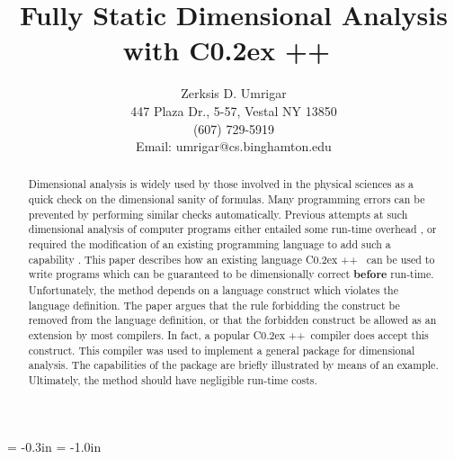 
\pagestyle{empty}
\footskip 2in %


\hoffset= -0.3in
\voffset= -1.0in
\setlength{\textwidth}{6.5in}\setlength{\textheight}{9in}
\setlength{\oddsidemargin}{0.3in}\setlength{\evensidemargin}{0.3in}
\setlength{\parindent}{0pt}\setlength{\parskip}{1.5ex}

\newcommand{\cpp}{C\raise 0.2ex \hbox{++}}
\newcommand{\gpp}{G\raise 0.2ex \hbox{++}}
\newcommand{\meter}{\hbox{Meter}}
\newcommand{\kg}{\hbox{Kg}}
\newcommand{\second}{\hbox{Sec}}

\title{Fully Static Dimensional Analysis with \cpp\ }
\author{
Zerksis D. Umrigar\\
447 Plaza Dr., 5-57, Vestal NY 13850\\
(607) 729-5919\\
Email: umrigar@cs.binghamton.edu
}
\date{}

\maketitle

\begin{abstract}

Dimensional analysis is widely used by those involved in the
physical sciences as a quick check on the dimensional sanity of
formulas.  Many programming errors can be prevented by performing
similar checks automatically.  Previous attempts at such
dimensional analysis of computer programs either entailed some
run-time overhead \cite{cmelik:88} \cite{hilfinger:88}, or
required the modification of an existing programming language to
add such a capability \cite{gehani:77} \cite{house:83}.  This
paper describes how an existing language \cpp\
\cite{stroustrup:91} can be used to write programs which can be
guaranteed to be dimensionally correct {\bf before} run-time.
Unfortunately, the method depends on a language construct which
violates the language definition.  The paper argues that the rule
forbidding the construct be removed from the language definition,
or that the forbidden construct be allowed as an extension by most
compilers.  In fact, a popular \cpp\ compiler does accept this
construct.  This compiler was used to implement a general package
for dimensional analysis.  The capabilities of the package are
briefly illustrated by means of an example.  Ultimately, the
method should have negligible run-time costs.

\end{abstract}

